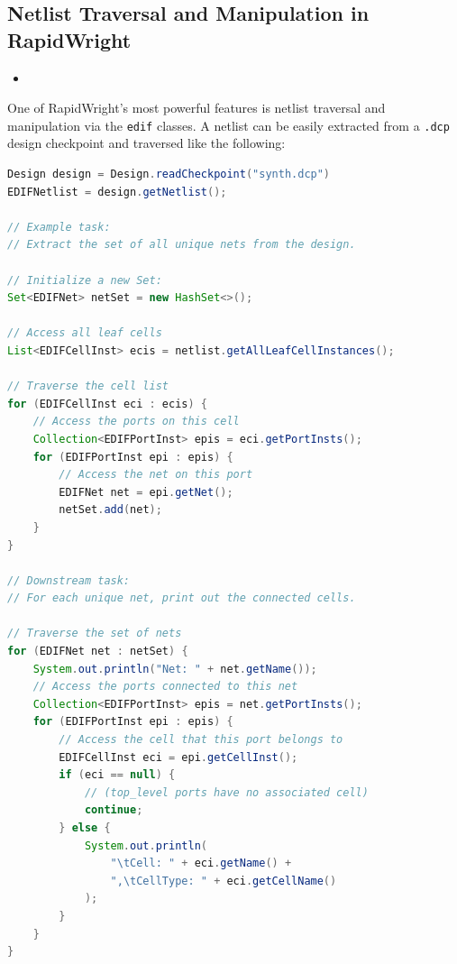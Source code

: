 \begin{multicols}{2}

\subsection{Netlist Traversal and Manipulation in RapidWright}

\begin{itemize}
\item


\end{itemize}

One of RapidWright's most powerful features is netlist traversal and manipulation via the \texttt{edif} classes. A netlist can be easily extracted from a \texttt{.dcp} design checkpoint and traversed like the following: 

\begin{lstlisting}[language=java, caption={Netlist extraction and traversal}, label={lst:netlist_extract}]
Design design = Design.readCheckpoint("synth.dcp")
EDIFNetlist = design.getNetlist();

// Example task:
// Extract the set of all unique nets from the design.

// Initialize a new Set:
Set<EDIFNet> netSet = new HashSet<>();

// Access all leaf cells
List<EDIFCellInst> ecis = netlist.getAllLeafCellInstances();

// Traverse the cell list
for (EDIFCellInst eci : ecis) {
    // Access the ports on this cell
    Collection<EDIFPortInst> epis = eci.getPortInsts();
    for (EDIFPortInst epi : epis) {
        // Access the net on this port
        EDIFNet net = epi.getNet();
        netSet.add(net);
    }
}

// Downstream task:
// For each unique net, print out the connected cells.

// Traverse the set of nets
for (EDIFNet net : netSet) {
    System.out.println("Net: " + net.getName());
    // Access the ports connected to this net
    Collection<EDIFPortInst> epis = net.getPortInsts();
    for (EDIFPortInst epi : epis) {
        // Access the cell that this port belongs to
        EDIFCellInst eci = epi.getCellInst();
        if (eci == null) {
            // (top_level ports have no associated cell)
            continue;
        } else {
            System.out.println(
                "\tCell: " + eci.getName() + 
                ",\tCellType: " + eci.getCellName()
            );
        }
    }
}


\end{lstlisting}
\end{multicols}
